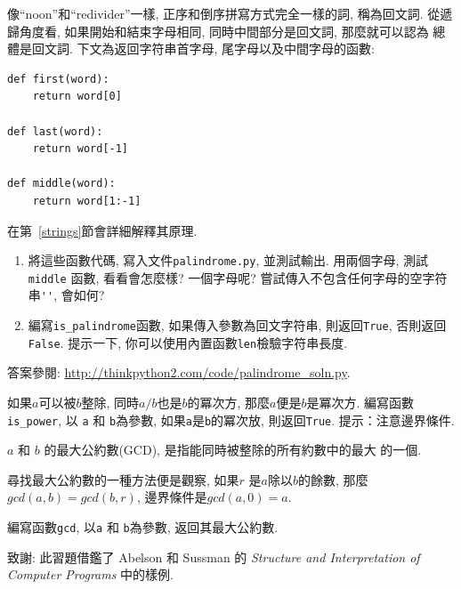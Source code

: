 \documentclass[10pt]{book}
\begin{document}
\begin{exercise}
\label{palindrome}

像``noon''和``redivider''一樣, 正序和倒序拼寫方式完全一樣的詞, 稱為回文詞. 
從遞歸角度看, 如果開始和結束字母相同, 同時中間部分是回文詞, 那麼就可以認為
總體是回文詞. 
下文為返回字符串首字母, 尾字母以及中間字母的函數:

\begin{verbatim}
def first(word):
    return word[0]

def last(word):
    return word[-1]

def middle(word):
    return word[1:-1]
\end{verbatim}
%

在第~\ref{strings}節會詳細解釋其原理.

\begin{enumerate}

\item 將這些函數代碼, 寫入文件{\tt palindrome.py}, 並測試輸出. 
用兩個字母, 測試 {\tt middle} 函數, 看看會怎麼樣? 一個字母呢?  
嘗試傳入不包含任何字母的空字符串\verb"''",  會如何?

\item 編寫\verb"is_palindrome"函數, 如果傳入參數為回文字符串, 
則返回{\tt True},  否則返回{\tt False}. 
提示一下, 你可以使用內置函數{\tt len}檢驗字符串長度. 

\end{enumerate}

答案參閱: \url{http://thinkpython2.com/code/palindrome_soln.py}.

\end{exercise}

\begin{exercise}

如果$a$可以被$b$整除, 同時$a/b$也是$b$的冪次方, 那麼$a$便是$b$是冪次方. 
編寫函數\verb"is_power", 
以 {\tt a} 和 {\tt b}為參數, 如果{\tt a}是{\tt b}的冪次放, 則返回{\tt True}. 
提示：注意邊界條件. 

\end{exercise}


\begin{exercise}

 $a$ 和 $b$ 的最大公約數(GCD), 是指能同時被整除的所有約數中的最大
的一個. 

尋找最大公約數的一種方法便是觀察, 如果$r$ 是$a$除以$b$的餘數, 
那麼$gcd(a, b) = gcd(b, r)$, 邊界條件是$gcd(a, 0) = a$.

編寫函數\verb"gcd", 以{\tt a} 和 {\tt b}為參數, 返回其最大公約數. 


致謝: 此習題借鑑了 Abelson 和
Sussman 的 {\em Structure and Interpretation of Computer Programs} 中的樣例.

\end{exercise}
\end{document}
